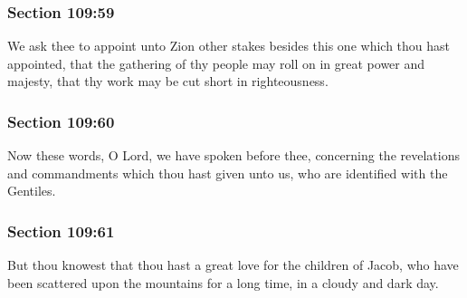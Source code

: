 	\subsubsection{Section 109:59} %
		\label{DC109-59}

		We ask thee to appoint unto Zion other stakes besides this one which thou hast appointed, that the gathering of thy people may roll on in great power and majesty, that thy work may be cut short in righteousness.


	\subsubsection{Section 109:60} %
		\label{DC109-60}

		Now these words, O Lord, we have spoken before thee, concerning the revelations and commandments which thou hast given unto us, who are identified with the Gentiles.


	\subsubsection{Section 109:61} %
		\label{DC109-61}

		But thou knowest that thou hast a great love for the children of Jacob, who have been scattered upon the mountains for a long time, in a cloudy and dark day.


